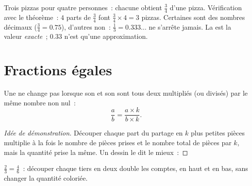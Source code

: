 \begin{example}\label{ex:g6:fractions:pizzas}
Trois pizzas pour quatre personnes~: chacune obtient $\frac34$ d'une
pizza. Vérification avec le théorème~: $4$ parts de $\frac34$ font
$\frac34 \times 4 = 3$ pizzas. Certaines  sont des nombres
décimaux ($\frac34 = 0.75$), d'autres non~: $\frac13 = 0.333\dots$ ne
s'arrête jamais. La  est la valeur \emph{exacte}~; $0.33$
n'est qu'une approximation.
\end{example}

\section{Fractions égales}

\begin{proposition}\label{prop:g6:fractions:equal}
Une  ne change pas lorsque son  et son 
sont tous deux multipliés (ou divisés) par le même nombre non nul~:
\[
\frac{a}{b} = \frac{a \times k}{b \times k} .
\]
\end{proposition}

\begin{proof}[Idée de démonstration]
Découper chaque part du partage en $k$ plus petites pièces multiplie
à la fois le nombre de pièces prises et le nombre total de pièces par
$k$, mais la quantité prise  la même. Un dessin le dit le mieux~:
\end{proof}

\begin{omfigure}

{\small $\frac23 = \frac46$~: découper chaque tiers en deux double les
comptes, en haut et en bas, sans changer la quantité coloriée.}
\end{omfigure}

